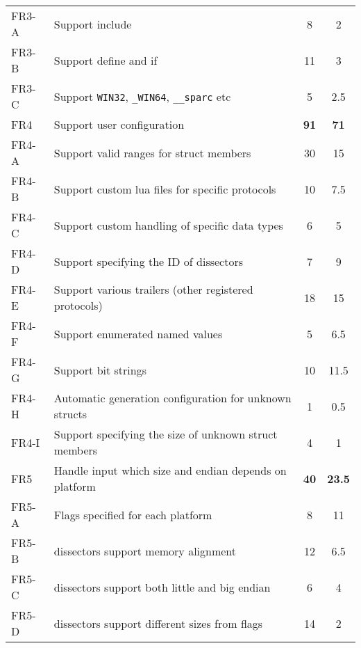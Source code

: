 \begin{table}[ht]
\begin{tabularx}{\textwidth}{l X c c}
	FR3-A & Support \gls{include} & 8 & 2 \\
	FR3-B & Support \gls{define} and \gls{if} & 11 & 3 \\
	FR3-C & Support \verb+WIN32+, \verb+_WIN64+, \verb+__sparc+ etc & 5 & 2.5 \\
	\addlinespace
	FR4 & Support user configuration &  \textbf{91} & \textbf{71}\\
	FR4-A & Support valid ranges for \gls{struct} \glspl{member} & 30 & 15 \\
	FR4-B & Support custom \Gls{lua} files for specific protocols & 10 & 7.5 \\
	FR4-C & Support custom handling of specific data types & 6 & 5 \\
	FR4-D & Support specifying the ID of \glspl{dissector} & 7 & 9 \\
	FR4-E & Support various \gls{trailers} (other registered protocols) & 18 & 15 \\
	FR4-F & Support \glspl{enumerated named value}  & 5 & 6.5 \\
	FR4-G & Support bit strings & 10 & 11.5 \\
	FR4-H & Automatic generation configuration for unknown structs & 1 & 0.5\\
	FR4-I & Support specifying the size of unknown struct members & 4 & 1\\
	\addlinespace
	FR5 & Handle input which size and \gls{endian} depends on platform & \textbf{40} & \textbf{23.5} \\
	FR5-A & Flags specified for each platform & 8 & 11 \\
	FR5-B & \Glspl{dissector} support memory alignment & 12 & 6.5 \\
	FR5-C & \Glspl{dissector} support both little and big \gls{endian} & 6 & 4 \\
	FR5-D & \Glspl{dissector} support different sizes from flags & 14 & 2 \\	
    \bottomrule
\end{tabularx}
\end{table}	
	
